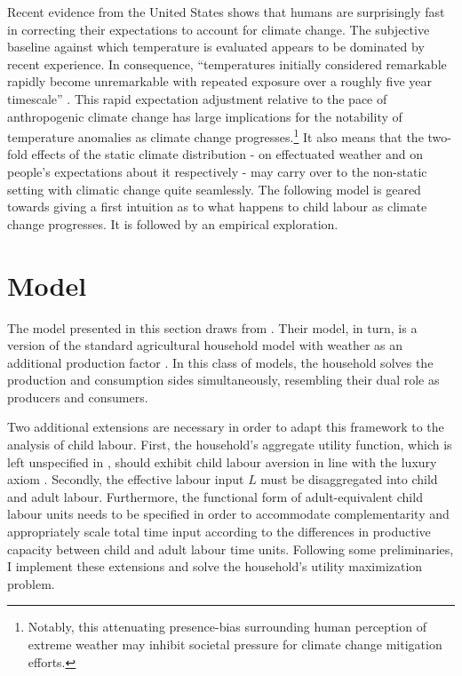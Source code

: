 \documentclass[a4paper,12pt]{article}
\theoremstyle{plain}
\theoremstyle{definition}
\theoremstyle{definition}
\theoremstyle{definition}
\theoremstyle{definition}
\begin{document}
Recent evidence from the United States shows that humans are surprisingly fast in correcting their expectations to account for climate change. The subjective baseline against which temperature is evaluated appears to be dominated by recent experience. In consequence, ``temperatures initially considered remarkable rapidly become unremarkable with repeated exposure over a roughly five year timescale'' \citep[][p. 4909]{Moore2019}. This rapid expectation adjustment relative to the pace of anthropogenic climate change has large implications for the notability of temperature anomalies as climate change progresses.\footnote{Notably, this attenuating presence-bias surrounding human perception of extreme weather may inhibit societal pressure for climate change mitigation efforts.} It also means that the two-fold effects of the static climate distribution - on effectuated weather and on people's expectations about it respectively - may carry over to the non-static setting with climatic change quite seamlessly. The following model is geared towards giving a first intuition as to what happens to child labour as climate change progresses. It is followed by an empirical exploration.

\section{Model}
\label{sec:model}

The model presented in this section draws from \citet{Jessoe2018}. Their model, in turn, is a version of the standard agricultural household model \citep{Singgh1986} with weather as an additional production factor \citep[as in][]{ravallion1988}. In this class of models, the household solves the production and consumption sides simultaneously, resembling their dual role as producers and consumers.

Two additional extensions are necessary in order to adapt this framework to the analysis of child labour. First, the household's aggregate utility function, which is left unspecified in 
\citet{Jessoe2018}, should exhibit child labour aversion in line with the luxury axiom \citep{Basu1998}. Secondly, the effective labour input $L$ must be disaggregated into child and adult labour. Furthermore, the functional form of adult-equivalent child labour units needs to be specified in order to accommodate complementarity and appropriately scale total time input according to the differences in productive capacity between child and adult labour time units. Following some preliminaries, I implement these extensions and solve the household's utility maximization problem.
\end{document}
